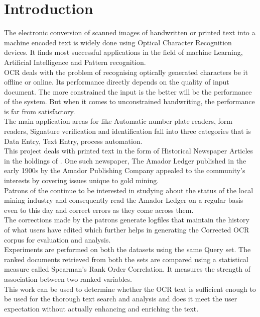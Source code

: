 \section{Introduction}
The electronic conversion of scanned images of handwritten or printed text into a machine encoded text is widely done using Optical Character Recognition devices.  It finds most successful applications in the field of machine Learning, Artificial Intelligence and Pattern recognition.\\
OCR deals with the problem of recognising optically generated characters be it offline or online. Its performance directly depends on the quality of input document. The more constrained the input is the better will be the performance of the system. But when it comes to unconstrained handwriting, the performance is far from satisfactory.\\
The main application areas for \cite{OCR} like Automatic number plate readers, form readers, Signature verification and identification fall into three categories that is Data Entry, Text Entry, process automation.\\
This project deals with printed text in the form of Historical Newspaper Articles in the holdings of \cite{cdnc}. One such newspaper, The Amador Ledger published in the early 1900s by the Amador Publishing Company appealed to the community's interests by covering issues unique to gold mining.\\ 
Patrons of the \cite{cdnc} continue to be interested in studying about the status of the local mining industry and consequently read the Amador Ledger on a regular basis even to this day and correct \cite{OCR} errors as they come across them.\\
The corrections made by the patrons generate logfiles that maintain the history of what users have edited which further helps in generating the Corrected OCR corpus for evaluation and analysis.\\
Experiments are performed on both the datasets using the same Query set. The ranked documents retrieved from both the sets are compared using a statistical measure called Spearman's Rank Order Correlation. It measures the strength of association between two ranked variables.\\
This work can be used to determine whether the OCR text is sufficient enough to be used for the thorough text search and analysis and does it meet the user expectation without actually enhancing and enriching the text.\\

